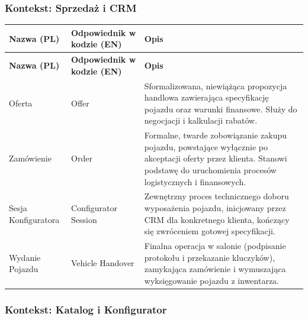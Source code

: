 \subsubsection{Kontekst: Sprzedaż i CRM}

\begin{longtable}{|p{4cm}|p{4cm}|p{8cm}|}
\hline
\textbf{Nazwa (PL)} & \textbf{Odpowiednik w kodzie (EN)} & \textbf{Opis} \\
\hline
\endfirsthead

\hline
\textbf{Nazwa (PL)} & \textbf{Odpowiednik w kodzie (EN)} & \textbf{Opis} \\
\hline
\endhead

Oferta & Offer & Sformalizowana, niewiążąca propozycja handlowa zawierająca specyfikację pojazdu oraz warunki finansowe. Służy do negocjacji i kalkulacji rabatów. \\
\hline

Zamówienie & Order & Formalne, twarde zobowiązanie zakupu pojazdu, powstające wyłącznie po akceptacji oferty przez klienta. Stanowi podstawę do uruchomienia procesów logistycznych i finansowych. \\
\hline

Sesja Konfiguratora & Configurator Session & Zewnętrzny proces technicznego doboru wyposażenia pojazdu, inicjowany przez CRM dla konkretnego klienta, kończący się zwróceniem gotowej specyfikacji. \\
\hline

Wydanie Pojazdu & Vehicle Handover & Finalna operacja w salonie (podpisanie protokołu i przekazanie kluczyków), zamykająca zamówienie i wymuszająca wyksięgowanie pojazdu z inwentarza. \\
\hline
\end{longtable}

\subsubsection{Kontekst: Katalog i Konfigurator}

